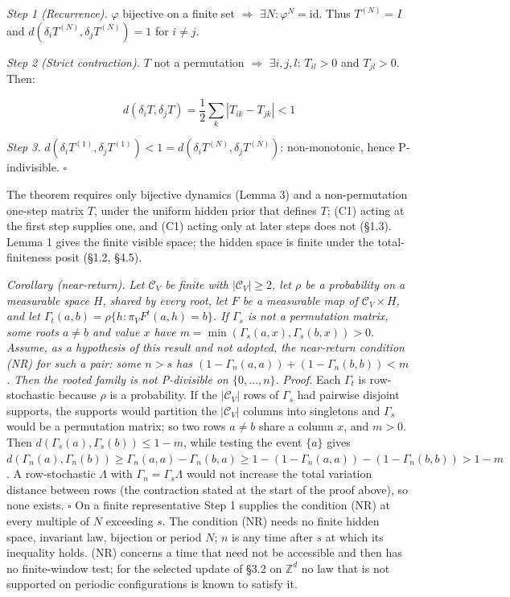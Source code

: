 \documentclass[
]{article}
\begin{document}
\emph{Step 1 (Recurrence).} \(\varphi\) bijective on a finite set
\(\Rightarrow\) \(\exists N: \varphi^N = \text{id}\). Thus
\(T^{(N)} = I\) and \(d(\delta_i T^{(N)}, \delta_j T^{(N)}) = 1\) for
\(i \neq j\).

\emph{Step 2 (Strict contraction).} \(T\) not a permutation
\(\Rightarrow\) \(\exists i, j, l\): \(T_{il} > 0\) and \(T_{jl} > 0\).
Then:

\[d(\delta_i T, \delta_j T) = \frac{1}{2}\sum_k |T_{ik} - T_{jk}| < 1\]

\emph{Step 3.}
\(d(\delta_i T^{(1)}, \delta_j T^{(1)}) < 1 = d(\delta_i T^{(N)}, \delta_j T^{(N)})\):
non-monotonic, hence P-indivisible. \(\square\)

The theorem requires only bijective dynamics (Lemma 3) and a
non-permutation one-step matrix \(T\), under the uniform hidden prior
that defines \(T\); (C1) acting at the first step supplies one, and (C1)
acting only at later steps does not (§1.3). Lemma 1 gives the finite
visible space; the hidden space is finite under the total-finiteness
posit (§1.2, §4.5).

\emph{Corollary (near-return).} \emph{Let \(\mathcal{C}_V\) be finite
with \(|\mathcal{C}_V| \geq 2\), let \(\rho\) be a probability on a
measurable space \(H\), shared by every root, let \(F\) be a measurable
map of \(\mathcal{C}_V \times H\), and let
\(\Gamma_t(a, b) = \rho\{h : \pi_V F^t(a, h) = b\}\). If \(\Gamma_s\) is
not a permutation matrix, some roots \(a \neq b\) and value \(x\) have
\(m = \min(\Gamma_s(a, x), \Gamma_s(b, x)) > 0\). Assume, as a
hypothesis of this result and not adopted, the near-return condition
(NR) for such a pair: some \(n > s\) has
\((1 - \Gamma_n(a, a)) + (1 - \Gamma_n(b, b)) < m\). Then the rooted
family is not P-divisible on \(\{0, \ldots, n\}\).} \emph{Proof.} Each
\(\Gamma_t\) is row-stochastic because \(\rho\) is a probability. If the
\(|\mathcal{C}_V|\) rows of \(\Gamma_s\) had pairwise disjoint supports,
the supports would partition the \(|\mathcal{C}_V|\) columns into
singletons and \(\Gamma_s\) would be a permutation matrix; so two rows
\(a \neq b\) share a column \(x\), and \(m > 0\). Then
\(d(\Gamma_s(a), \Gamma_s(b)) \leq 1 - m\), while testing the event
\(\{a\}\) gives
\(d(\Gamma_n(a), \Gamma_n(b)) \geq \Gamma_n(a, a) - \Gamma_n(b, a) \geq 1 - (1 - \Gamma_n(a, a)) - (1 - \Gamma_n(b, b)) > 1 - m\).
A row-stochastic \(\Lambda\) with \(\Gamma_n = \Gamma_s \Lambda\) would
not increase the total variation distance between rows (the contraction
stated at the start of the proof above), so none exists. \(\square\) On
a finite representative Step 1 supplies the condition (NR) at every
multiple of \(N\) exceeding \(s\). The condition (NR) needs no finite
hidden space, invariant law, bijection or period \(N\); \(n\) is any
time after \(s\) at which its inequality holds. (NR) concerns a time
that need not be accessible and then has no finite-window test; for the
selected update of §3.2 on \(\mathbb{Z}^d\) no law that is not supported
on periodic configurations is known to satisfy it.
\end{document}
